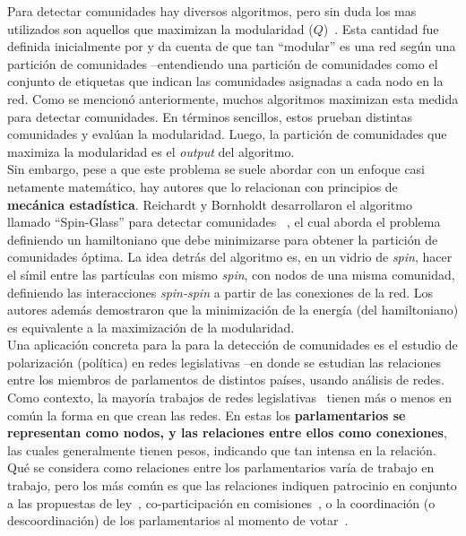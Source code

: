 \documentclass{proyectotesis}
\begin{document}
Para detectar comunidades hay diversos algoritmos, pero sin duda los mas utilizados son aquellos que maximizan la modularidad ($Q$)~\cite{newman_fast_2004, clauset_finding_2004, duch_community_2005, blondel_fast_2008, arab_modularity_2012, chen_community_2014}. Esta cantidad fue definida inicialmente por \citet{newman_finding_2004} y da cuenta de que tan ``modular'' es una red según una partición de comunidades --entendiendo una partición de comunidades como el conjunto de etiquetas que indican las comunidades asignadas a cada nodo en la red. Como se mencionó anteriormente, muchos algoritmos maximizan esta medida para detectar comunidades. En términos sencillos, estos prueban distintas comunidades y evalúan la modularidad. Luego, la partición de comunidades que maximiza la modularidad es el \textit{output} del algoritmo.\\

Sin embargo, pese a que este problema se suele abordar con un enfoque casi netamente matemático, hay autores que lo relacionan con principios de \textbf{mecánica estadística}. Reichardt y Bornholdt desarrollaron el algoritmo llamado ``Spin-Glass'' para detectar comunidades ~\cite{reichardt_statistical_2006}, el cual aborda el problema definiendo un hamiltoniano que debe minimizarse para obtener la partición de comunidades óptima. La idea detrás del algoritmo es, en un vidrio de \textit{spin}, hacer el símil entre las partículas con mismo \textit{spin}, con nodos de una misma comunidad, definiendo las interacciones \textit{spin-spin} a partir de las conexiones de la red. Los autores además demostraron que la minimización de la energía (del hamiltoniano) es equivalente a la maximización de la modularidad.\\

Una aplicación concreta para la para la detección de comunidades es el estudio de polarización (política) en redes legislativas --en donde se estudian las relaciones entre los miembros de  parlamentos de distintos países, usando análisis de redes.\\

Como contexto, la mayoría trabajos de redes legislativas~\cite{neal_sign_2020, marenco_time_2020, intal_dissent_2021, schoch_legislators_2020, aleman_explaining_2013, zhang_community_2007, fowler_connecting_2007, porter_network_2005, andris_rise_2015, briatte_network_2016, le_foulon_moran_cooperation_2020}
tienen más o menos en común la forma en que crean las redes. En estas los \textbf{parlamentarios se representan como nodos, y las relaciones entre ellos como conexiones}, las cuales generalmente tienen pesos, indicando que tan intensa en la relación. Qué se considera como relaciones entre los parlamentarios varía de trabajo en trabajo, pero los más común es que las relaciones indiquen patrocinio en conjunto a las propuestas de ley~\cite{neal_sign_2020, zhang_community_2007, le_foulon_moran_cooperation_2020,fowler_connecting_2007}, co-participación en comisiones~\cite{porter_network_2005}, o la coordinación (o descoordinación) de los parlamentarios al momento de votar~\cite{andris_rise_2015, marenco_time_2020, schoch_legislators_2020, intal_dissent_2021}.\\
\end{document}
